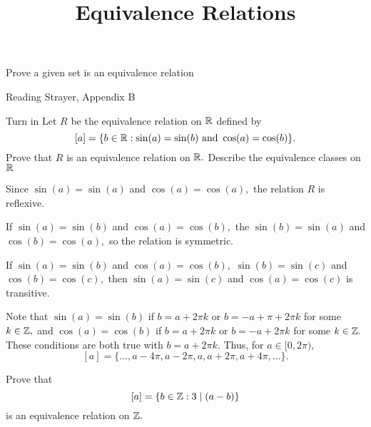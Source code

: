 \documentclass{ximera}
\title{Equivalence Relations}
\begin{document}
\begin{abstract}
\end{abstract}
\maketitle

\begin{obj}
  \item Prove a given set is an equivalence relation
\end{obj}

\begin{pre}
  \item[Reading] Strayer, Appendix B
  \item[Turn in] Let $R$ be the equivalence relation on $\mathbb R$
  defined by
  \[
 [a]=\{b\in\mathbb R:\sin(a)=\sin(b) \textnormal{ and }\cos(a)=\cos(b)\}.\]
   Prove that $R$ is an equivalence relation on $\mathbb R.$
 Describe the equivalence classes on $\mathbb R$
 
 \begin{solution}
      Since $\sin(a)=\sin(a)$ and $\cos(a)=\cos(a),$ the relation $R$ is reflexive.

      If $\sin(a)=\sin(b)$ and $\cos(a)=\cos(b),$ the $\sin(b)=\sin(a)$ and $\cos(b)=\cos(a),$ so the relation is symmetric.

      If $\sin(a)=\sin(b)$ and $\cos(a)=\cos(b),$ $\sin(b)=\sin(c)$ and $\cos(b)=\cos(c),$ then $\sin(a)=\sin(c)$ and $\cos(a)=\cos(c)$ is transitive.

      Note that $\sin(a)=\sin(b)$ if $b=a+2\pi k$ or $b=-a+\pi+2\pi k$ for some $k\in\mathbb Z,$ and  $\cos(a)=\cos(b)$ if $b=a+2\pi k$ or $b=-a+2\pi k$ for some $k\in\mathbb Z.$ These conditions are both true with $b=a+2\pi k$. Thus, for $a\in[0,2\pi),$
      \[
          [a]=\{\dots,a-4\pi,a-2\pi,a,a+2\pi,a+4\pi,\dots\}.
      \]
     \end{solution}
\end{pre}

\begin{br}
    Prove that \[[a]=\{b\in\mathbb Z: 3\mid(a-b)\}\] is an equivalence relation on $\mathbb Z.$
  \end{br}
  
\end{document}
